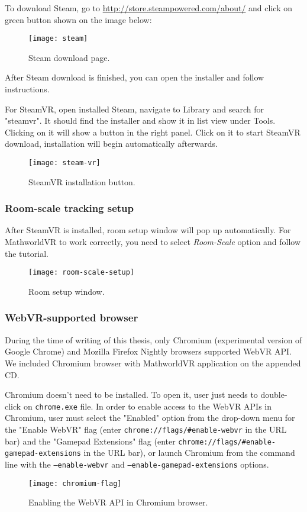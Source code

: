To download Steam, go to \url{http://store.steampowered.com/about/} and click on green button shown on the image below:

\begin{figure}[ht!]
\centering
\texttt{[image: steam]}
\caption{Steam download page.}
\label{r:71}
\end{figure}

After Steam download is finished, you can open the installer and follow instructions.

For SteamVR, open installed Steam, navigate to \textsf{Library} and search for "steamvr". It should find the installer and show it in list view under \textsf{Tools}. Clicking on it will show a button in the right panel. Click on it to start SteamVR download, installation will begin automatically afterwards.

\begin{figure}[ht!]
\centering
\texttt{[image: steam-vr]}
\caption{SteamVR installation button.}
\label{r:72}
\end{figure}

\newpage
\subsubsection*{Room-scale tracking setup}
After SteamVR is installed, room setup window will pop up automatically. For MathworldVR to work correctly, you need to select \textsl{Room-Scale} option and follow the tutorial.

\begin{figure}[ht!]
\centering
\texttt{[image: room-scale-setup]}
\caption{Room setup window.}
\label{r:73}
\end{figure}

\subsubsection*{WebVR-supported browser}
During the time of writing of this thesis, only Chromium (experimental version of Google Chrome) and Mozilla Firefox Nightly browsers supported WebVR API. We included Chromium browser with MathworldVR application on the appended CD.

Chromium doesn't need to be installed. To open it, user just needs to double-click on \texttt{chrome.exe} file. In order to enable access to the WebVR APIs in Chromium, user must select the "Enabled" option from the drop-down menu for the "Enable WebVR" flag (enter \texttt{chrome://flags/#enable-webvr} in the URL bar) and the "Gamepad Extensions" flag (enter \texttt{chrome://flags/#enable-gamepad-extensions} in the URL bar), or launch Chromium from the command line with the \texttt{--enable-webvr} and \texttt{--enable-gamepad-extensions} options.

\begin{figure}[ht!]
\centering
\texttt{[image: chromium-flag]}
\caption{Enabling the WebVR API in Chromium browser.}
\label{r:74}
\end{figure}


